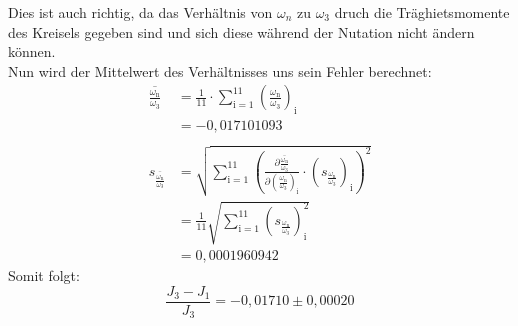 Dies ist auch richtig, da das Verhältnis von $\omega_n$ zu $\omega_3$ druch die Träghietsmomente des Kreisels gegeben sind und sich diese während der Nutation nicht ändern können.\\
Nun wird der Mittelwert des Verhältnisses uns sein Fehler berechnet:
\begin{align*}
    \overline{\frac{\omega_\text{n}}{\omega_3}}&=\frac{1}{11}\cdot\sum_{\text{i}=1}^{11}\left(\frac{\omega_\text{n}}{\omega_3}\right)_\text{i}\\
    &=-0,017101093\\\\
    s_{\overline{\frac{\omega_\text{n}}{\omega_3}}}&=\sqrt{\sum_{\text{i}=1}^{11}\left(\frac{\partial\overline{\frac{\omega_\text{n}}{\omega_3}}}{\partial\left(\frac{\omega_\text{n}}{\omega_3}\right)_\text{i}}\cdot \left(s_{\frac{\omega_\text{n}}{\omega_3}}\right)_\text{i}\right)^2}\\
    &=\frac{1}{11}\sqrt{\sum_{\text{i}=1}^{11}\left(s_{\frac{\omega_\text{n}}{\omega_3}}\right)_\text{i}^2}\\
    &=0,0001960942
\end{align*}
Somit folgt:
\begin{equation*}
    \frac{J_3-J_1}{J_3}=-0,01710\pm0,00020
\end{equation*}